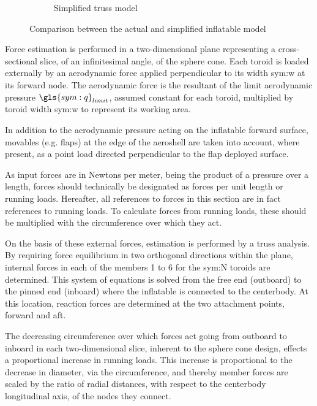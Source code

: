\begin{figure}[h]
\begin{subfigure}[b]{0.3\textwidth}
	\caption{Simplified truss model} 
	\label{fig:TC2}
	\end{subfigure}
	\caption{Comparison between the actual and simplified inflatable model}
	\label{fig:TC}
\end{figure}

Force estimation is performed in a two-dimensional plane representing a cross-sectional slice, of an infinitesimal angle, of the sphere cone. Each toroid is loaded externally by an aerodynamic force applied perpendicular to its width \gls{sym:w} at its forward node. The aerodynamic force is the resultant of the limit aerodynamic pressure $\gls{sym:q}_{limit}$, assumed constant for each toroid, multiplied by toroid width \gls{sym:w} to represent its working area. %

In addition to the aerodynamic pressure acting on the inflatable forward surface, movables (e.g. flaps) at the edge of the aeroshell are taken into account, where present, as a point load directed perpendicular to the flap deployed surface.

As input forces are in Newtons per meter, being the product of a pressure over a length, forces should technically be designated as forces per unit length or running loads. Hereafter, all references to forces in this section are in fact references to running loads. To calculate forces from running loads, these should be multiplied with the circumference over which they act.

On the basis of these external forces, estimation is performed by a truss analysis. By requiring force equilibrium in two orthogonal directions within the plane, internal forces in each of the members 1 to 6 for the \gls{sym:N} toroids are determined. This system of equations is solved from the free end (outboard) to the pinned end (inboard) where the inflatable is connected to the centerbody. At this location, reaction forces are determined at the two attachment points, forward and aft.

The decreasing circumference over which forces act going from outboard to inboard in each two-dimensional slice, inherent to the sphere cone design, effects a proportional increase in running loads. This increase is proportional to the decrease in diameter, via the circumference, and thereby member forces are scaled by the ratio of radial distances, with respect to the centerbody longitudinal axis, of the nodes they connect.

